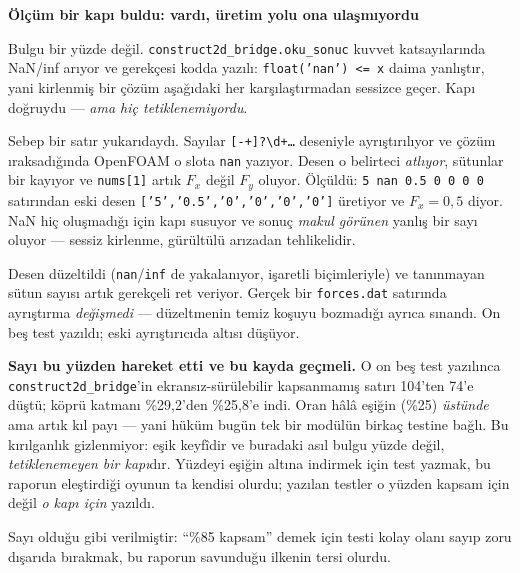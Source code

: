 \documentclass[11pt,a4paper]{article}
\newcommand{\kkkenar}{lacivert}
\newcommand{\kkzemin}{kod}
\newenvironment{renkkutu}[3]{%
  \renewcommand{\kkkenar}{#1}\renewcommand{\kkzemin}{#2}%
  \par\medskip\noindent
  \begin{lrbox}{\kutugovde}%
  \begin{minipage}{\dimexpr\linewidth-2\fboxsep-2\fboxrule\relax}\footnotesize
  \textcolor{#1}{\textbf{#3}}\par\vspace{3pt}%
}{%
  \end{minipage}%
  \end{lrbox}%
  \noindent\fcolorbox{\kkkenar}{\kkzemin}{\usebox{\kutugovde}}%
  \par\medskip
}
\newenvironment{dikkat}[1]{\begin{renkkutu}{orta}{ortabg}{#1}}{\end{renkkutu}}
\begin{document}
\begin{dikkat}{Ölçüm bir kapı buldu: vardı, üretim yolu ona ulaşmıyordu}
Bulgu bir yüzde değil. \texttt{construct2d\_bridge.oku\_sonuc} kuvvet
katsayılarında NaN/inf arıyor ve gerekçesi kodda yazılı: \texttt{float('nan')
\textless{}= x} daima yanlıştır, yani kirlenmiş bir çözüm aşağıdaki her
karşılaştırmadan sessizce geçer. Kapı doğruydu --- \emph{ama hiç
tetiklenemiyordu}.

\noindent Sebep bir satır yukarıdaydı. Sayılar
\texttt{[-+]?\textbackslash{}d+…} deseniyle ayrıştırılıyor ve çözüm
ıraksadığında OpenFOAM o slota \texttt{nan} yazıyor. Desen o belirteci
\emph{atlıyor}, sütunlar bir kayıyor ve \texttt{nums[1]} artık $F_x$ değil
$F_y$ oluyor. Ölçüldü: \texttt{5 nan 0.5 0 0 0 0} satırından eski desen
\texttt{['5','0.5','0','0','0','0']} üretiyor ve $F_x = 0{,}5$ diyor. NaN hiç
oluşmadığı için kapı susuyor ve sonuç \emph{makul görünen} yanlış bir sayı
oluyor --- sessiz kirlenme, gürültülü arızadan tehlikelidir.

\noindent Desen düzeltildi (\texttt{nan}/\texttt{inf} de yakalanıyor, işaretli
biçimleriyle) ve tanınmayan sütun sayısı artık gerekçeli ret veriyor. Gerçek bir
\texttt{forces.dat} satırında ayrıştırma \emph{değişmedi} --- düzeltmenin temiz
koşuyu bozmadığı ayrıca sınandı. On beş test yazıldı; eski ayrıştırıcıda altısı
düşüyor.

\noindent \textbf{Sayı bu yüzden hareket etti ve bu kayda geçmeli.} O on beş
test yazılınca \texttt{construct2d\_bridge}'in ekransız-sürülebilir
kapsanmamış satırı 104'ten 74'e düştü; köprü katmanı \%29{,}2'den \%25{,}8'e
indi. Oran hâlâ eşiğin (\%25) \emph{üstünde} ama artık kıl payı --- yani
hüküm bugün tek bir modülün birkaç testine bağlı. Bu kırılganlık gizlenmiyor:
eşik keyfîdir ve buradaki asıl bulgu yüzde değil, \emph{tetiklenemeyen bir
kapı}dır. Yüzdeyi eşiğin altına indirmek için test yazmak, bu raporun
eleştirdiği oyunun ta kendisi olurdu; yazılan testler o yüzden kapsam için
değil \emph{o kapı için} yazıldı.
\end{dikkat} Sayı olduğu gibi verilmiştir: ``\%85
kapsam'' demek için testi kolay olanı sayıp zoru dışarıda bırakmak, bu raporun
savunduğu ilkenin tersi olurdu.
\end{document}
